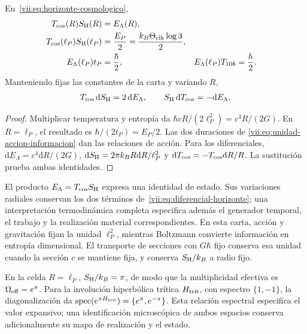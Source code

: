 \begin{theorem}
\label{vii:thm:celda-media-accion}
En~\eqref{vii:eq:horizonte-cosmologico},
\begin{align}
 T_{\rm cos}(R)S_{\rm H}(R)&=E_\Lambda(R),\\
 T_{\rm cos}(\ell_P)S_{\rm H}(\ell_P)
 &=\frac{E_P}{2}=\frac{k_B\Theta_{\rm clk}\log3}{2},\\
 E_\Lambda(\ell_P)t_P&=\frac{\hbar}{2},&
 E_\Lambda(\ell_P)T_{108}&=\frac h2.
 \label{vii:eq:media-accion-horizonte}
\end{align}
Manteniendo fijas las constantes de la carta y variando \(R\),
\begin{equation}
 T_{\rm cos}\,\mathrm dS_{\rm H}=2\,\mathrm dE_\Lambda,
 \qquad S_{\rm H}\,\mathrm dT_{\rm cos}=-\mathrm dE_\Lambda.
 \label{vii:eq:diferencial-horizonte}
\end{equation}
\end{theorem}
\begin{proof}
Multiplicar temperatura y entropía da
\(\hbar cR/(2\ell_P^2)=c^4R/(2G)\).
En \(R=\ell_P\), el resultado es
\(\hbar/(2t_P)=E_P/2\). Las dos duraciones de
\eqref{vii:eq:unidad-accion-informacion} dan las relaciones de acción.
Para los diferenciales,
\(\mathrm dE_\Lambda=c^4\mathrm dR/(2G)\),
\(\mathrm dS_{\rm H}=2\pi k_BR\mathrm dR/\ell_P^2\) y
\(\mathrm dT_{\rm cos}=-T_{\rm cos}\mathrm dR/R\).
La sustitución prueba ambas identidades.
\end{proof}

El producto \(E_\Lambda=T_{\rm cos}S_{\rm H}\) expresa una
identidad de estado. Sus variaciones radiales conservan los dos términos
de~\eqref{vii:eq:diferencial-horizonte}; una interpretación termodinámica
completa especifica además el generador temporal, el trabajo y la
realización material correspondientes. En esta carta, acción y
gravitación fijan la unidad \(\ell_P^2\), mientras Boltzmann convierte
información en entropía dimensional. El transporte de secciones con
\(G\hbar\) fijo conserva esa unidad cuando la sección \(c\) se
mantiene fija, y conserva \(S_{\rm H}/k_B\) a radio fijo.

En la celda \(R=\ell_P\), \(S_{\rm H}/k_B=\pi\), de modo que
la multiplicidad efectiva es \(\Omega_{\rm eff}=e^\pi\).
Para la involución hiperbólica trítica \(H_{\rm trit}\), con espectro
\(\{1,-1\}\), la diagonalización da
\(\operatorname{spec}(e^{\pi H_{\rm trit}})=\{e^\pi,e^{-\pi}\}\).
Esta relación espectral especifica el valor expansivo; una identificación
microscópica de ambos espacios conserva adicionalmente su mapa de
realización y el estado.

